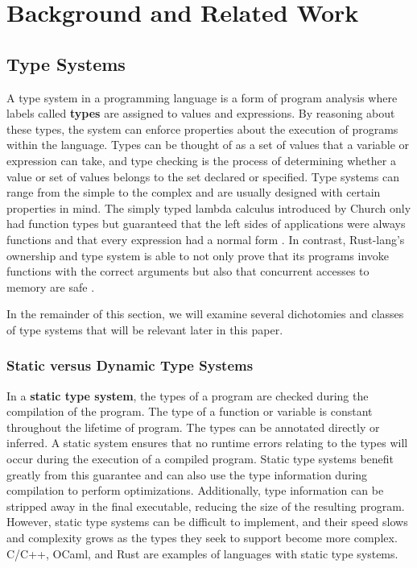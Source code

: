 \documentclass{book}
\begin{document}
\chapter{Background and Related Work}

\section{Type Systems}

A type system in a programming language is a form of program analysis where labels called \textbf{types} are assigned to values and expressions. By reasoning about these types, the system can enforce properties about the execution of programs within the language. Types can be thought of as a set of values that a variable or expression can take, and type checking is the process of determining whether a value or set of values belongs to the set declared or specified. Type systems can range from the simple to the complex and are usually designed with certain properties in mind. The simply typed lambda calculus introduced by Church only had function types but guaranteed that the left sides of applications were always functions and that every expression had a normal form \cite{Church1940AFO}. In contrast, Rust-lang's ownership and type system is able to not only prove that its programs invoke functions with the correct arguments but also that concurrent accesses to memory are safe \cite{rustlang}.

In the remainder of this section, we will examine several dichotomies and classes of type systems that will be relevant later in this paper.

\subsection{Static versus Dynamic Type Systems}

In a \textbf{static type system}, the types of a program are checked during the compilation of the program. The type of a function or variable is constant throughout the lifetime of program. The types can be annotated directly or inferred. A static system ensures that no runtime errors relating to the types will occur during the execution of a compiled program. Static type systems benefit greatly from this guarantee and can also use the type information during compilation to perform optimizations. Additionally, type information can be stripped away in the final executable, reducing the size of the resulting program. However, static type systems can be difficult to implement, and their speed slows and complexity grows as the types they seek to support become more complex. C/C++, OCaml, and Rust are examples of languages with static type systems.
\end{document}
